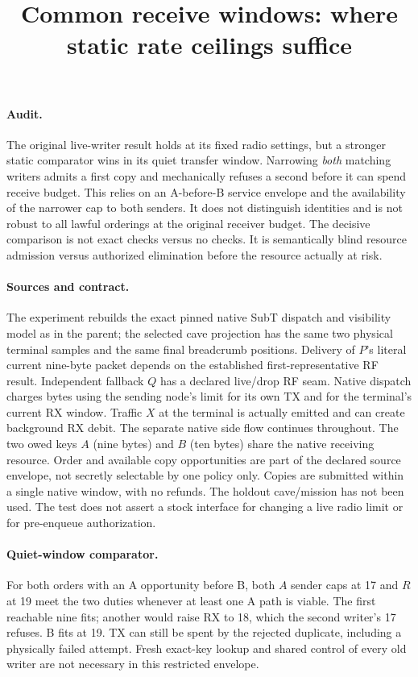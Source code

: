 \documentclass{article}
\title{Common receive windows: where static rate ceilings suffice}
\author{}
\date{}
\begin{document}
\maketitle
\paragraph{Audit.}
The original live-writer result holds at its fixed radio settings,
but a stronger static comparator wins in its quiet transfer
window. Narrowing \emph{both} matching writers admits a first
copy and mechanically refuses a second before it can spend
receive budget. This relies on an A-before-B service envelope
and the availability of the narrower cap to both senders. It
does not distinguish identities and is not robust to all lawful
orderings at the original receiver budget. The decisive
comparison is not exact checks versus no checks. It is semantically
blind resource admission versus authorized elimination before the
resource actually at risk.

\paragraph{Sources and contract.}
The experiment rebuilds the exact pinned native SubT dispatch and
visibility model as in the parent; the selected cave projection
has the same two physical terminal samples and the same final
breadcrumb positions. Delivery of $P$'s literal current nine-byte
packet depends on the established first-representative RF result.
Independent fallback $Q$ has a declared live/drop RF seam. Native
dispatch charges bytes using the sending node's limit for its
own TX and for the terminal's current RX window. Traffic $X$ at
the terminal is actually emitted and can create background RX
debit. The separate native side flow continues throughout.
The two owed keys $A$ (nine bytes) and $B$ (ten bytes) share the
native receiving resource. Order and available copy opportunities
are part of the declared source envelope, not secretly selectable
by one policy only. Copies are submitted within a single native
window, with no refunds. The holdout cave/mission has not been
used. The test does not assert a stock interface for changing a
live radio limit or for pre-enqueue authorization.

\paragraph{Quiet-window comparator.}
For both orders with an A opportunity before B, both $A$ sender
caps at 17 and $R$ at 19 meet the two duties whenever at least
one A path is viable. The first reachable nine fits; another
would raise RX to 18, which the second writer's 17 refuses. B
fits at 19. TX can still be spent by the rejected duplicate,
including a physically failed attempt. Fresh exact-key lookup
and shared control of every old writer are not necessary in
this restricted envelope.
\end{document}
